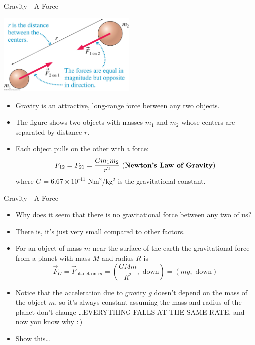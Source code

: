 \documentclass{beamer}
\begin{document}
\begin{frame}{Gravity - A Force}
\begin{center}
   \includegraphics[width=0.5\textwidth]{../figures/06_06_Figure.jpg}
\end{center}
\begin{itemize}
   \item Gravity is an attractive, long-range force between any two objects.
   \item The figure shows two objects with masses $m_1$ and $m_2$ whose centers are separated by distance $r$.
   \item Each object pulls on the other with a force:
   \begin{equation*}
      F_{12} = F_{21} = \frac{Gm_1m_2}{r^2} ~(\text{\bf Newton's Law of Gravity})
   \end{equation*}
   where $G = 6.67 × 10^{–11}$ Nm$^2$/kg$^2$ is the gravitational constant.
\end{itemize}
\end{frame}

\begin{frame}{Gravity - A Force}
\begin{itemize}
   \item Why does it seem that there is no gravitational force between any two of us?
   \item<2-> There is, it's just very small compared to other factors.
   \item<3-> For an object of mass $m$ near the surface of the earth the gravitational force from a planet with mass $M$ and radius $R$ is
   \begin{equation*}
      \vec{F}_G = \vec{F}_{\text{planet on }m} = \left(\frac{GMm}{R^2},\text{ down}\right) = (mg,\text{ down})
   \end{equation*}
   \item<4-> Notice that the acceleration due to gravity $g$ doesn't depend on the mass of the object $m$, so it's always constant assuming the mass and radius of the planet don't change \ldots EVERYTHING FALLS AT THE SAME RATE, and now you know why $:)$
   \item<5-> Show this\ldots {}
\end{itemize}
\end{frame}
\end{document}

